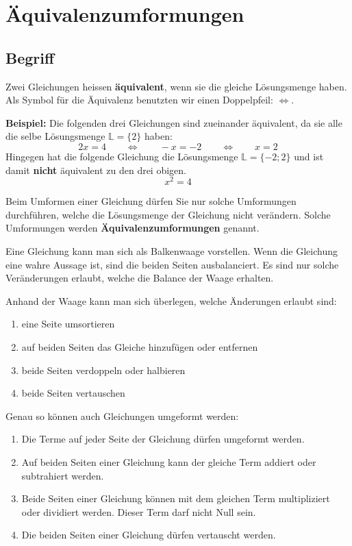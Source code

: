 \newpage
\section{Äquivalenzumformungen}

\subsection{Begriff}
Zwei Gleichungen heissen \textbf{äquivalent}, wenn sie die gleiche Lösungsmenge haben. Als Symbol für die Äquivalenz benutzten wir einen Doppelpfeil: $\Leftrightarrow$.

\begin{example}
  \textbf{Beispiel:} Die folgenden drei Gleichungen sind zueinander äquivalent, da sie alle die selbe Lösungsmenge $\mathbb{L} = \{2\}$ haben:
  \[
    2x = 4 \qquad\Leftrightarrow\qquad -x = -2 \qquad\Leftrightarrow\qquad x = 2
  \]
  Hingegen hat die folgende Gleichung die Lösungsmenge $ \mathbb{L} = \{ -2; 2 \}$ und ist damit \textbf{nicht} äquivalent zu den drei obigen.
  \[
  x^{2} = 4
  \]
\end{example}

Beim Umformen einer Gleichung dürfen Sie nur solche Umformungen durchführen, welche die Lösungsmenge der Gleichung nicht verändern.
Solche Umformungen werden \textbf{Äquivalenzumformungen} genannt.

Eine Gleichung kann man sich als Balkenwaage vorstellen. Wenn die Gleichung eine wahre Aussage ist, sind die beiden Seiten ausbalanciert. Es sind nur solche Veränderungen erlaubt, welche die Balance der Waage erhalten.
\begin{center}
\end{center}
Anhand der Waage kann man sich überlegen, welche Änderungen erlaubt sind:

\begin{enumerate}
  \item eine Seite umsortieren
  \item auf beiden Seiten das Gleiche hinzufügen oder entfernen
  \item beide Seiten verdoppeln oder halbieren
  \item beide Seiten vertauschen
\end{enumerate}

Genau so können auch Gleichungen umgeformt werden:

\begin{enumerate}
  \item Die Terme auf jeder Seite der Gleichung dürfen umgeformt werden.
  \item Auf beiden Seiten einer Gleichung kann der gleiche Term addiert oder subtrahiert werden.
  \item Beide Seiten einer Gleichung können mit dem gleichen Term multipliziert oder dividiert werden. Dieser Term darf nicht Null sein.
  \item Die beiden Seiten einer Gleichung dürfen vertauscht werden.
\end{enumerate}

